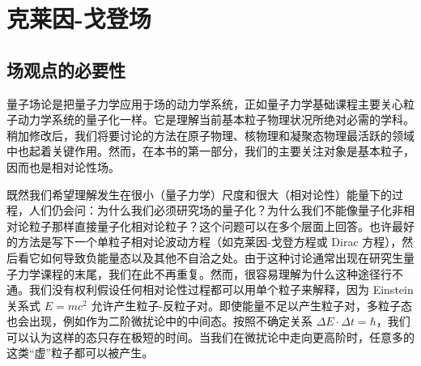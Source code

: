 \chapter{克莱因-戈登场}

\section{场观点的必要性}

量子场论是把量子力学应用于场的动力学系统，正如量子力学基础课程主要关心粒子动力学系统的量子化一样。它是理解当前基本粒子物理状况所绝对必需的学科。稍加修改后，我们将要讨论的方法在原子物理、核物理和凝聚态物理最活跃的领域中也起着关键作用。然而，在本书的第一部分，我们的主要关注对象是基本粒子，因而也是相对论性场。

既然我们希望理解发生在很小（量子力学）尺度和很大（相对论性）能量下的过程，人们仍会问：为什么我们必须研究场的量子化？为什么我们不能像量子化非相对论粒子那样直接量子化相对论粒子？这个问题可以在多个层面上回答。也许最好的方法是写下一个单粒子相对论波动方程（如克莱因-戈登方程或 Dirac 方程），然后看它如何导致负能量态以及其他不自洽之处。由于这种讨论通常出现在研究生量子力学课程的末尾，我们在此不再重复。然而，很容易理解为什么这种途径行不通。我们没有权利假设任何相对论性过程都可以用单个粒子来解释，因为 Einstein 关系式 $E=mc^2$ 允许产生粒子-反粒子对。即使能量不足以产生粒子对，多粒子态也会出现，例如作为二阶微扰论中的中间态。按照不确定关系 $\Delta E\cdot\Delta t = \hbar$，我们可以认为这样的态只存在极短的时间。当我们在微扰论中走向更高阶时，任意多的这类``虚''粒子都可以被产生。

